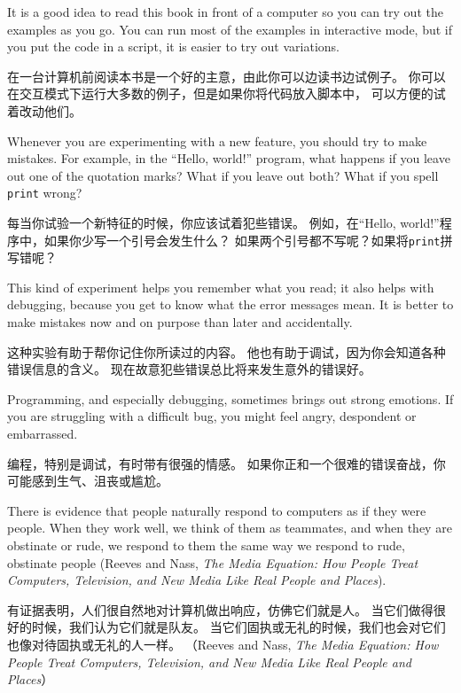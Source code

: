 \documentclass[10pt]{book}
\begin{document}
\begin{CJK}{UTF8}{gbsn}
It is a good idea to read this book in front of a computer so you can
try out the examples as you go.  You can run most of the examples in
interactive mode, but if you put the code in a script, it is easier
to try out variations.

在一台计算机前阅读本书是一个好的主意，由此你可以边读书边试例子。
你可以在交互模式下运行大多数的例子，但是如果你将代码放入脚本中，
可以方便的试着改动他们。

Whenever you are experimenting with a new feature, you should try
to make mistakes.  For example, in the ``Hello, world!'' program,
what happens if you leave out one of the quotation marks?  What
if you leave out both?  What if you spell {\tt print} wrong?

每当你试验一个新特征的时候，你应该试着犯些错误。
例如，在``Hello, world!''程序中，如果你少写一个引号会发生什么？
如果两个引号都不写呢？如果将{\tt print}拼写错呢？

This kind of experiment helps you remember what you read; it also helps
with debugging, because you get to know what the error messages mean.
It is better to make mistakes now and on purpose than later
and accidentally.

这种实验有助于帮你记住你所读过的内容。
他也有助于调试，因为你会知道各种错误信息的含义。
现在故意犯些错误总比将来发生意外的错误好。

Programming, and especially debugging, sometimes brings out strong
emotions.  If you are struggling with a difficult bug, you might 
feel angry, despondent or embarrassed.

编程，特别是调试，有时带有很强的情感。
如果你正和一个很难的错误奋战，你可能感到生气、沮丧或尴尬。

There is evidence that people naturally respond to computers as if
they were people.  When they work well, we think
of them as teammates, and when they are obstinate or rude, we
respond to them the same way we respond to rude,
obstinate people (Reeves and Nass, {\it The Media
    Equation: How People Treat Computers, Television, and New Media
    Like Real People and Places}).

有证据表明，人们很自然地对计算机做出响应，仿佛它们就是人。
当它们做得很好的时候，我们认为它们就是队友。
当它们固执或无礼的时候，我们也会对它们也像对待固执或无礼的人一样。
（Reeves and Nass, {\it The Media Equation: 
How People Treat Computers, Television, and New Media 
Like Real People and Places}）


\end{CJK}
\end{document}

